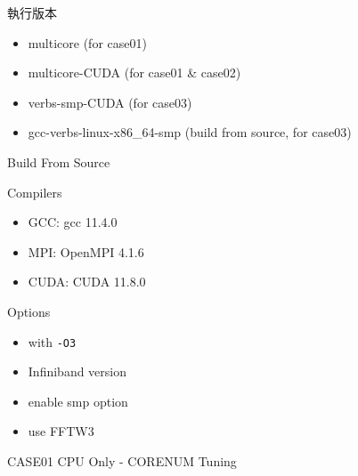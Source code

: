 \documentclass[aspectratio=169]{beamer}
\begin{document}
    \begin{frame}{執行版本}
        \begin{itemize}
            \item multicore (for case01)
            \item multicore-CUDA (for case01 \& case02)
            \item verbs-smp-CUDA (for case03)
            \item gcc-verbs-linux-x86\_64-smp (build from source, for case03)
        \end{itemize}
    \end{frame}

    \begin{frame}{Build From Source}
        \begin{block}{Compilers}
            \begin{itemize}
                \item GCC: gcc 11.4.0
                \item MPI: OpenMPI 4.1.6
                \item CUDA: CUDA 11.8.0
            \end{itemize}
        \end{block}
        \begin{block}{Options}
            \begin{itemize}
                \item with \texttt{-O3}
                \item Infiniband version
                \item enable smp option
                \item use FFTW3
            \end{itemize}
        \end{block}
    \end{frame}
    
    \begin{frame}{CASE01 CPU Only - CORENUM Tuning}
        \begin{center}    
        \end{center}
    \end{frame}
\end{document}
